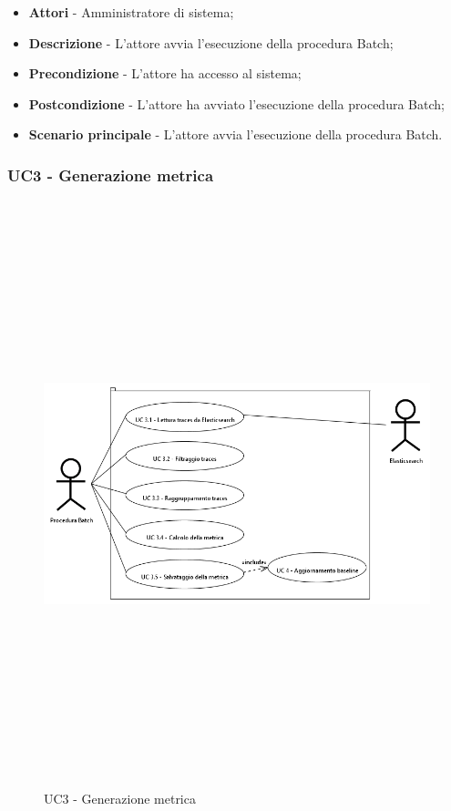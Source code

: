             \begin{itemize}

                \item \textbf{Attori} - Amministratore di sistema;
                \item \textbf{Descrizione} - L'attore avvia l'esecuzione della procedura Batch;
                \item \textbf{Precondizione} - L'attore ha accesso al sistema;
                \item \textbf{Postcondizione} - L'attore ha avviato l'esecuzione della procedura Batch;
                \item \textbf{Scenario principale} - L'attore avvia l'esecuzione della procedura Batch.

            \end{itemize}

\newpage

        \subsubsection{UC3 - Generazione metrica}

            \begin{figure}[H]
                \centering
                \includegraphics[width=13cm,height=17cm,keepaspectratio]{./images/UC3.png}
                \caption{UC3 - Generazione metrica}
            \end{figure}

